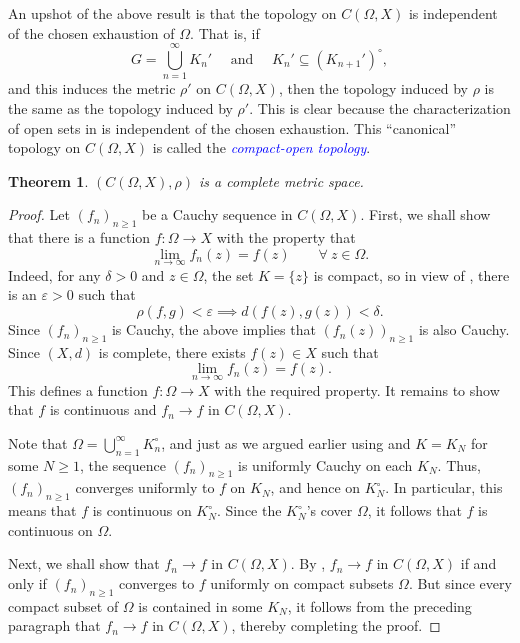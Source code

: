 \documentclass[11pt]{article}
\theoremstyle{thmstyle}
\newtheorem{theorem}{Theorem}[section]
\theoremstyle{defstyle}
\newcommand{\define}[1]{\textcolor{blue}{\textit{#1}}}
\renewcommand{\ge}{\geqslant}
\begin{document}
An upshot of the above result is that the topology on $C(\Omega, X)$ is independent of the chosen exhaustion of $\Omega$. That is, if 
\begin{equation*}
    G = \bigcup_{n = 1}^\infty K_n'\quad\text{ and }\quad K_n'\subseteq \left(K_{n + 1}'\right)^\circ,
\end{equation*}
and this induces the metric $\rho'$ on $C(\Omega, X)$, then the topology induced by $\rho$ is the same as the topology induced by $\rho'$. This is clear because the characterization of open sets in  is independent of the chosen exhaustion. This ``canonical'' topology on $C(\Omega, X)$ is called the \define{compact-open topology}.

\begin{theorem}
    $\left(C(\Omega, X),\rho\right)$ is a complete metric space.
\end{theorem}
\begin{proof}
    Let $(f_n)_{n\ge 1}$ be a Cauchy sequence in $C(\Omega, X)$. First, we shall show that there is a function $f\colon\Omega\to X$ with the property that 
    \begin{equation*}
        \lim_{n\to\infty} f_n(z) =  f(z) \qquad\forall~z\in\Omega.
    \end{equation*}
    Indeed, for any $\delta > 0$ and $z\in \Omega$, the set $K = \{z\}$ is compact, so in view of , there is an $\varepsilon > 0$ such that 
    \begin{equation*}
        \rho(f, g) < \varepsilon\implies d(f(z), g(z)) < \delta.
    \end{equation*}
    Since $(f_n)_{n\ge 1}$ is Cauchy, the above implies that $(f_n(z))_{n\ge 1}$ is also Cauchy. Since $(X, d)$ is complete, there exists $f(z)\in X$ such that 
    \begin{equation*}
        \lim_{n\to\infty} f_n(z) = f(z).
    \end{equation*}
    This defines a function $f\colon\Omega\to X$ with the required property. It remains to show that $f$ is continuous and $f_n\to f$ in $C(\Omega, X)$. 

    Note that $\displaystyle\Omega = \bigcup_{n = 1}^\infty K_n^\circ$, and just as we argued earlier using  and $K = K_N$ for some $N\ge 1$, the sequence $(f_n)_{n\ge 1}$ is uniformly Cauchy on each $K_N$. Thus, $(f_n)_{n\ge 1}$ converges uniformly to $f$ on $K_N$, and hence on $K_N^\circ$. In particular, this means that $f$ is continuous on $K_N^\circ$. Since the $K_N^\circ$'s cover $\Omega$, it follows that $f$ is continuous on $\Omega$.

    Next, we shall show that $f_n\to f$ in $C(\Omega, X)$. By , $f_n\to f$ in $C(\Omega, X)$ if and only if $(f_n)_{n\ge 1}$ converges to $f$ uniformly on compact subsets $\Omega$. But since every compact subset of $\Omega$ is contained in some $K_N$, it follows from the preceding paragraph that $f_n\to f$ in $C(\Omega, X)$, thereby completing the proof.
\end{proof}
\end{document}
